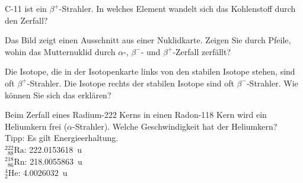 \documentclass[12pt,a4paper,twoside]{article}
\newcommand{\Kern}[3]{$^{#1}_{\phantom{1}#2}\text{#3}$}
\begin{document}
\begin{aufgabe}
	C-11 ist ein $\beta^{+}$-Strahler. In welches Element wandelt sich das Kohlenstoff durch den Zerfall?
\end{aufgabe}

\begin{aufgabe}
	Das Bild zeigt einen Ausschnitt aus einer Nuklidkarte. 
	Zeigen Sie durch Pfeile, wohin das Mutternuklid durch $\alpha$-, $\beta^{-}$- und $\beta^{+}$-Zerfall zerfällt?

	\begin{center}
		
	\end{center}

\end{aufgabe}

\begin{aufgabe}
	Die Isotope, die in der Isotopenkarte links von den stabilen Isotope stehen, sind oft $\beta^{+}$-Strahler.
	Die Isotope rechts der stabilen Isotope sind oft $\beta^{-}$-Strahler. Wie können Sie sich das erklären?
\end{aufgabe}

\begin{aufgabe}
	Beim Zerfall eines Radium-222 Kerns in einen Radon-118 Kern wird ein Heliumkern frei ($\alpha$-Strahler).
	Welche Geschwindigkeit hat der Heliumkern? \\
	Tipp: Es gilt Energieerhaltung.\\
	\Kern{222}{88}{Ra}: \SI{222.0153618}{u}\\
	\Kern{218}{86}{Rn}: \SI{218.0055863}{u}\\
	$^4_2\text{He}$: \SI{4.0026032}{u}
\end{aufgabe}
\end{document}
